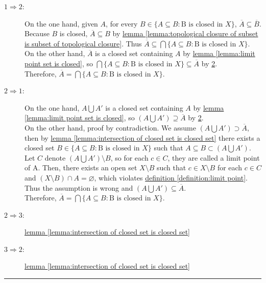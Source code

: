 \documentclass[12pt]{article}
\numberwithin{equation}{section}
\theoremstyle{plain} %
\theoremstyle{definition}
\theoremstyle{remark}
\newenvironment{proof}{{\bf Proof:}}{\hfill\rule{2mm}{2mm}}
\begin{document}
\begin{proof}
\begin{description}
	\item[$1 \Rightarrow 2$:] On the one hand, given $A$, for every $B \in \{A \subseteq B: \text{B is closed in }X\}$, $\overline{A} \subseteq \overline{B}$. Because $B$ is closed, $\overline{A} \subseteq {B}$ by \hyperref[lemma:topological closure of subset is subset of topological closure]{lemma \ref*{lemma:topological closure of subset is subset of topological closure}}. Thus $\overline{A} \subseteq \bigcap \{A \subseteq B: \text{B is closed in }X\}$. \\
	On the other hand, $\overline{A}$ is a closed set containing $A$ by \hyperref[lemma:limit point set is closed]{lemma \ref*{lemma:limit point set is closed}}, so $\bigcap \{A \subseteq B: \text{B is closed in }X\} \subseteq \overline{A}$ by \hyperref[definition:closure 2]{2}. \\
	Therefore, $\overline{A} = \bigcap \{A \subseteq B: \text{B is closed in }X\}$. 
	
	\item[$2 \Rightarrow 1$:] On the one hand, $A \bigcup A'$ is a closed set containing $A$ by \hyperref[lemma:limit point set is closed]{lemma \ref*{lemma:limit point set is closed}}, so $(A \bigcup A') \supseteq \overline{A}$ by \hyperref[definition:closure 2]{2}. \\
	On the other hand, proof by contradiction. We assume $(A \bigcup A') \supset \overline{A}$, then by \hyperref[lemma:intersection of closed set is closed set]{lemma \ref*{lemma:intersection of closed set is closed set}} there exists a closed set $B \in \{A \subseteq B: \text{B is closed in }X\}$ such that $A \subseteq B \subset (A \bigcup A')$. Let $C$ denote $(A \bigcup A') \setminus B$, so for each $c \in C$, they are called a limit point of A. Then, there exists an open set $X \setminus B$ such that $c \in X \setminus B$ for each $c \in C$ and $(X \setminus B) \cap A = \varnothing$, which violates \hyperref[definition:limit point]{definition \ref*{definition:limit point}}. Thus the assumption is wrong and $(A \bigcup A') \subseteq \overline{A}$.\\
	Therefore, $\overline{A} = \bigcap \{A \subseteq B: \text{B is closed in }X\}$. 
	
	\item[$2 \Rightarrow 3$:] \hyperref[lemma:intersection of closed set is closed set]{lemma \ref*{lemma:intersection of closed set is closed set}} 
	
	\item[$3 \Rightarrow 2$:] \hyperref[lemma:intersection of closed set is closed set]{lemma \ref*{lemma:intersection of closed set is closed set}} 
\end{description}
\end{proof}
\end{document}
